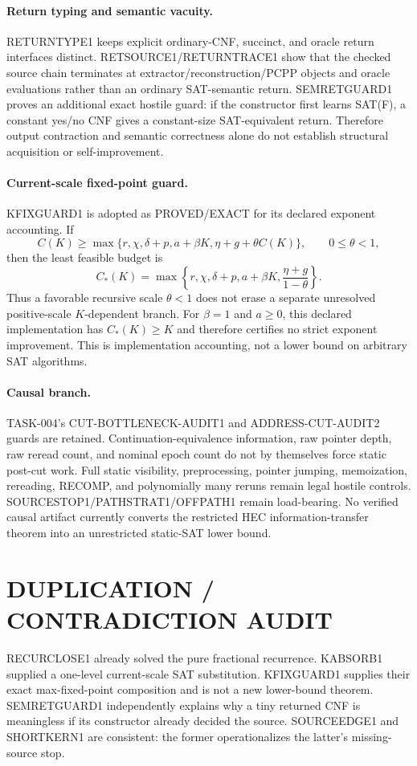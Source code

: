 \documentclass[11pt]{article}
\begin{document}
\paragraph{Return typing and semantic vacuity.}
RETURNTYPE1 keeps explicit ordinary-CNF, succinct, and oracle return interfaces distinct. RETSOURCE1/RETURNTRACE1 show that the checked source chain terminates at extractor/reconstruction/PCPP objects and oracle evaluations rather than an ordinary SAT-semantic return. SEMRETGUARD1 proves an additional exact hostile guard: if the constructor first learns SAT(F), a constant yes/no CNF gives a constant-size SAT-equivalent return. Therefore output contraction and semantic correctness alone do not establish structural acquisition or self-improvement.

\paragraph{Current-scale fixed-point guard.}
KFIXGUARD1 is adopted as PROVED/EXACT for its declared exponent accounting. If
\[
C(K)\ge\max\{r,\chi,\delta+p,a+\beta K,\eta+g+\theta C(K)\},
\qquad 0\le\theta<1,
\]
then the least feasible budget is
\[
C_*(K)=\max\left\{r,\chi,\delta+p,a+\beta K,
\frac{\eta+g}{1-\theta}\right\}.
\]
Thus a favorable recursive scale \(\theta<1\) does not erase a separate unresolved positive-scale \(K\)-dependent branch. For \(\beta=1\) and \(a\ge0\), this declared implementation has \(C_*(K)\ge K\) and therefore certifies no strict exponent improvement. This is implementation accounting, not a lower bound on arbitrary SAT algorithms.

\paragraph{Causal branch.}
TASK-004's CUT-BOTTLENECK-AUDIT1 and ADDRESS-CUT-AUDIT2 guards are retained. Continuation-equivalence information, raw pointer depth, raw reread count, and nominal epoch count do not by themselves force static post-cut work. Full static visibility, preprocessing, pointer jumping, memoization, rereading, RECOMP, and polynomially many reruns remain legal hostile controls. SOURCESTOP1/PATHSTRAT1/OFFPATH1 remain load-bearing. No verified causal artifact currently converts the restricted HEC information-transfer theorem into an unrestricted static-SAT lower bound.

\section*{DUPLICATION / CONTRADICTION AUDIT}
RECURCLOSE1 already solved the pure fractional recurrence. KABSORB1 supplied a one-level current-scale SAT substitution. KFIXGUARD1 supplies their exact max-fixed-point composition and is not a new lower-bound theorem. SEMRETGUARD1 independently explains why a tiny returned CNF is meaningless if its constructor already decided the source. SOURCEEDGE1 and SHORTKERN1 are consistent: the former operationalizes the latter's missing-source stop.
\end{document}
